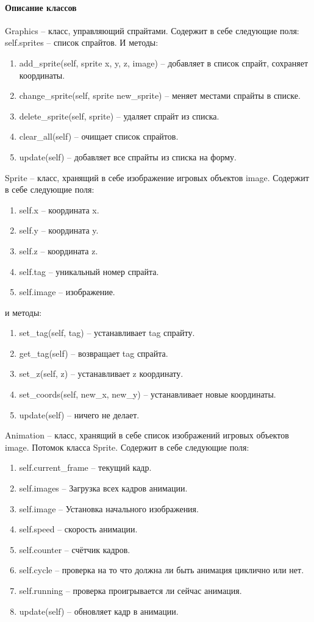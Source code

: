 \paragraph{Описание классов}
	Graphics -- класс, управляющий спрайтами. Содержит в себе следующие поля:
		self.sprites -- список спрайтов. И методы:
		\begin{enumerate}
			\item add\_sprite(self, sprite x, y, z, image) -- добавляет в список спрайт, сохраняет координаты.
			\item change\_sprite(self, sprite new\_sprite) -- меняет местами спрайты в списке.
			\item delete\_sprite(self, sprite) -- удаляет спрайт из списка.
			\item clear\_all(self) -- очищает список спрайтов.
			\item update(self) -- добавляет все спрайты из списка на форму.
		\end{enumerate}
	Sprite -- класс, хранящий в себе изображение игровых объектов image. Содержит в себе следующие поля:
		\begin{enumerate}
			\item self.x -- координата x.
			\item self.y -- координата y.
			\item self.z -- координата z.
			\item self.tag -- уникальный номер спрайта.
			\item self.image -- изображение.
		\end{enumerate}
		и методы:
		\begin{enumerate}
			\item set\_tag(self, tag) -- устанавливает tag спрайту.
			\item get\_tag(self) -- возвращает tag спрайта.
			\item set\_z(self, z) -- устанавливает z координату.
			\item set\_coords(self, new\_x, new\_y) -- устанавливает новые координаты.
			\item update(self) -- ничего не делает.
		\end{enumerate}
	Animation -- класс, хранящий в себе список изображений игровых объектов image. Потомок класса Sprite.  Содержит в себе следующие поля:
		\begin{enumerate}
			\item self.current\_frame -- текущий кадр.
			\item self.images  -- Загрузка всех кадров анимации.
			\item self.image -- Установка начального изображения.
			\item self.speed -- скорость анимации.
			\item self.counter -- счётчик кадров.
			\item self.cycle -- проверка на то что должна ли быть анимация циклично или нет.
			\item self.running -- проверка проигрывается ли сейчас анимация.
			\item update(self) -- обновляет кадр в анимации.
		\end{enumerate}
